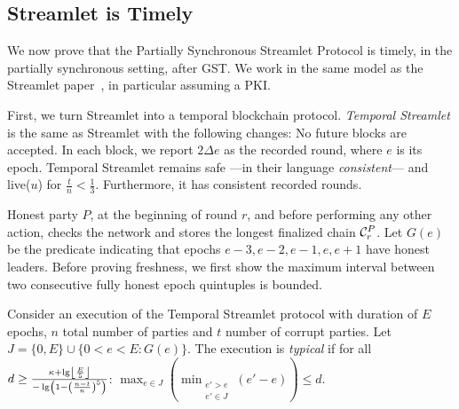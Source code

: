 \subsection{Streamlet is Timely}

We now prove that the Partially Synchronous Streamlet Protocol is timely,
in the partially synchronous setting, after GST.
We work in the same model as the Streamlet paper~\cite{streamlet},
in particular assuming a PKI.

First, we turn Streamlet into a temporal blockchain protocol.
\emph{Temporal Streamlet} is the same as Streamlet with the
following changes: No future blocks are accepted. In each block, we report
$2\Delta e$ as the recorded round, where $e$ is its epoch.
Temporal Streamlet remains safe ---in their language \emph{consistent}--- and live($u$)
for $\frac{t}{n} < \frac{1}{3}$. Furthermore, it has consistent recorded rounds.

Honest party $P$, at the beginning of round $r$, and
before performing any other action, checks the network and
stores the longest finalized chain $\chain^P_r$.
Let $G(e)$ be the predicate indicating that epochs $e-3,e-2,e-1,e,e+1$ have honest leaders.
Before proving freshness, we first show the maximum interval between two consecutive fully
honest epoch quintuples is bounded.

\begin{definition}
  Consider an execution of the Temporal Streamlet protocol with duration
  of $E$ epochs, $n$ total number of parties and $t$ number of corrupt parties.
  Let $J = \{0,E\} \cup \{0 < e < E: G(e)\}$.
  The execution is \emph{typical} if for all
  $d \geq \frac{\kappa + \lg \floor*{\frac{E}{5}}}{- \lg \left(1 - \left(\frac{n - t}{n}\right)^5\right)}$:
  $\max_{e \in J}(\min_{\substack{e' > e \\ e' \in J}}(e' - e)) \leq d$.
\end{definition}

